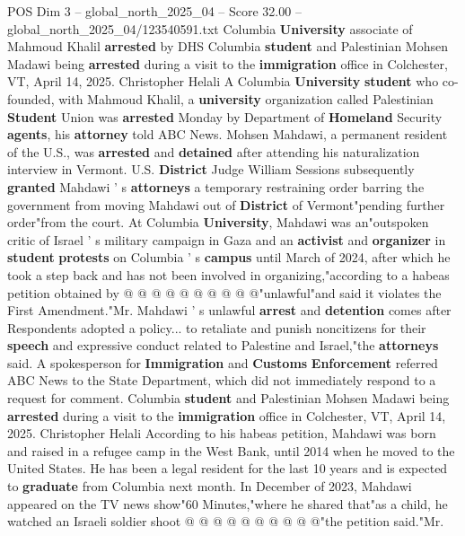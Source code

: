 \begin{textsample}{POS Dim 3 – global\_north\_2025\_04 – Score 32.00 – global\_north\_2025\_04/123540591.txt}  \label{ex:f3_pos_054}
Columbia \textbf{University} associate of Mahmoud Khalil \textbf{arrested} by DHS Columbia \textbf{student} and Palestinian Mohsen Madawi being \textbf{arrested} during a visit to the \textbf{immigration} office in Colchester, VT, April 14, 2025.
Christopher Helali A Columbia \textbf{University} \textbf{student} who co-founded, with Mahmoud Khalil, a \textbf{university} organization called Palestinian \textbf{Student} Union was \textbf{arrested} Monday by Department of \textbf{Homeland} Security \textbf{agents}, his \textbf{attorney} told ABC News.
Mohsen Mahdawi, a permanent resident of the U.S., was \textbf{arrested} and \textbf{detained} after attending his naturalization interview in Vermont.
U.S. \textbf{District} Judge William Sessions subsequently \textbf{granted} Mahdawi ' s \textbf{attorneys} a temporary restraining order barring the government from moving Mahdawi out of \textbf{District} of Vermont"pending further order"from the court.
At Columbia \textbf{University}, Mahdawi was an"outspoken critic of Israel ' s military campaign in Gaza and an \textbf{activist} and \textbf{organizer} in \textbf{student} \textbf{protests} on Columbia ' s \textbf{campus} until March of 2024, after which he took a step back and has not been involved in organizing,"according to a habeas petition obtained by @ @ @ @ @ @ @ @ @ @"unlawful"and said it violates the First Amendment."Mr.
Mahdawi ' s unlawful \textbf{arrest} and \textbf{detention} comes after Respondents adopted a policy... to retaliate and punish noncitizens for their \textbf{speech} and expressive conduct related to Palestine and Israel,"the \textbf{attorneys} said.
A spokesperson for \textbf{Immigration} and \textbf{Customs} \textbf{Enforcement} referred ABC News to the State Department, which did not immediately respond to a request for comment.
Columbia \textbf{student} and Palestinian Mohsen Madawi being \textbf{arrested} during a visit to the \textbf{immigration} office in Colchester, VT, April 14, 2025.
Christopher Helali According to his habeas petition, Mahdawi was born and raised in a refugee camp in the West Bank, until 2014 when he moved to the United States.
He has been a legal resident for the last 10 years and is expected to \textbf{graduate} from Columbia next month.
In December of 2023, Mahdawi appeared on the TV news show"60 Minutes,"where he shared that"as a child, he watched an Israeli soldier shoot @ @ @ @ @ @ @ @ @ @"the petition said."Mr.

\end{textsample}
